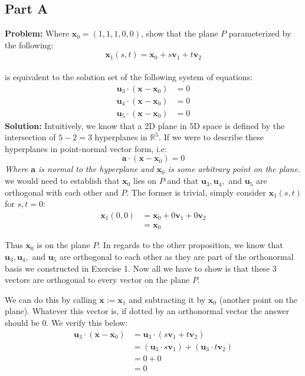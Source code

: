 \documentclass{article}
\begin{document}
\subsection*{Part A}
\textbf{Problem:} Where $\mathbf x_0=(1,1,1,0,0)$, show that the plane $P$ parameterized by the following:
$$\mathbf x_1(s,t)=\mathbf x_0+s\mathbf v_1+t\mathbf v_2$$
\\
is equivalent to the solution set of the following system of equations:
\begin{align*}
  \mathbf u_3\cdot(\mathbf x-\mathbf x_0) &= 0\\
  \mathbf u_4\cdot(\mathbf x-\mathbf x_0) &= 0\\
  \mathbf u_5\cdot(\mathbf x-\mathbf x_0) &= 0
\end{align*}
\textbf{Solution:} Intuitively, we know that a 2D plane in 5D space is defined by the intersection of $5-2=3$ hyperplanes in $\mathbb R^5$. If we were to describe these hyperplanes in point-normal vector form, i.e:
$$\mathbf a\cdot (\mathbf x-\mathbf x_0)=0$$
\textit{Where $\mathbf a$ is normal to the hyperplane and $\mathbf x_0$ is some arbitrary point on the plane.}
\\

we would need to establish that $\mathbf x_0$ lies on $P$ and that $\mathbf u_3,\mathbf u_4,$ and $\mathbf u_5$ are orthogonal with each other and $P$. The former is trivial, simply consider $\mathbf x_1(s,t)$ for $s,t=0$:
\begin{align*}
  \mathbf x_1(0,0)&=\mathbf x_0+0\mathbf v_1+0\mathbf v_2\\
  &=\mathbf x_0
\end{align*}

Thus $\mathbf x_0$ is on the plane $P$. In regards to the other proposition, we know that $\mathbf u_3,\mathbf u_4,$ and $\mathbf u_5$ are orthogonal to each other as they are part of the orthonormal basis we constructed in Exercise 1. Now all we have to show is that these 3 vectors are orthogonal to every vector on the plane $P$.

We can do this by calling $\mathbf x:=\mathbf x_1$ and subtracting it by $\mathbf x_0$ (another point on the plane). Whatever this vector is, if dotted by an orthonormal vector the answer should be 0. We verify this below:
\begin{align*}
  \mathbf u_3\cdot(\mathbf x-\mathbf x_0)&=\mathbf u_3\cdot(s\mathbf v_1+t\mathbf v_2)\\
  &=(\mathbf u_3\cdot s\mathbf v_1)+(\mathbf u_3\cdot t\mathbf v_2)\tag{distr. of dot prod.}\\
  &=0+0\tag{consequence of Gram-Schmidt}\\
  &=0
\end{align*}
\end{document}
